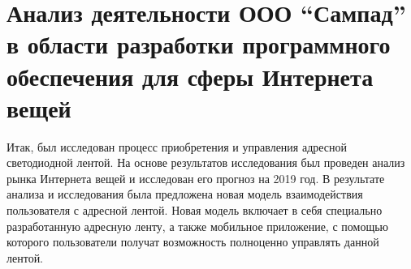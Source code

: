 \section{Анализ деятельности ООО \enquote{Сампад} в области разработки программного обеспечения для сферы Интернета вещей}
\label{sec:analysis}



% 





Итак, был исследован процесс приобретения и управления адресной светодиодной лентой. На основе результатов исследования был проведен анализ рынка Интернета вещей и исследован его прогноз на 2019 год. В результате анализа и исследования была предложена новая модель взаимодействия пользователя с адресной лентой. Новая модель включает в себя специально разработанную адресную ленту, а также мобильное приложение, с помощью которого пользователи получат возможность полноценно управлять данной лентой.
